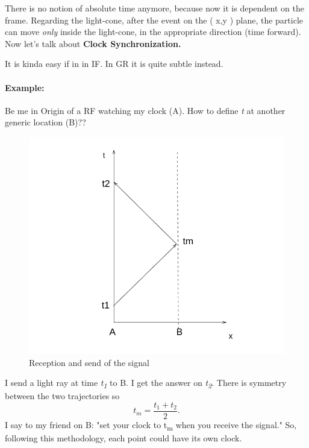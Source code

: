 There is no notion of absolute time anymore, because now it is dependent on the frame. 
Regarding the light-cone, after the event on the ( x,y ) plane, the particle can move \emph{only} inside the light-cone, in the appropriate direction (time forward).
Now let's talk about \textbf{Clock Synchronization.} \par
It is kinda easy if in in IF. In GR it is quite subtle instead. \par

\paragraph{Example:} Be me in Origin of a RF watching my clock (A). How to define \emph{t} at another generic location (B)??

\begin{figure}
\centering
\includegraphics[width=0.5\linewidth]{imm/segnale.png}
\caption{Reception and send of the signal}
\label{imm:segnale.png}
\end{figure}

I send a light ray at time \emph{t\textsubscript{1}} to B. I get the answer on \emph{t\textsubscript{2}}. There is symmetry between the two trajectories so \[
t_{m} = \frac{ t_{1} + t_{2} }{2}. 
\]
I say to my friend on B: "set your clock to t\textsubscript{m} when you receive the signal."
So, following this methodology, each point could have its own clock.


